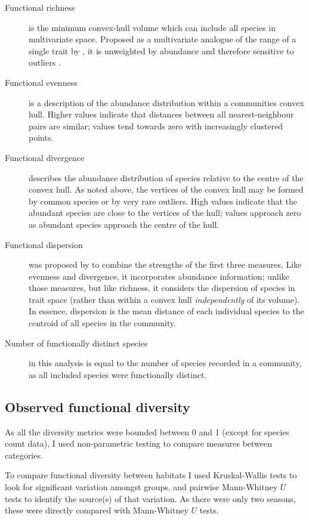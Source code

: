 \documentclass[12pt,a4paper,draft]{book}
\begin{document}
\begin{description}
\item[Functional richness] is the minimum convex-hull volume which can include all species in multivariate space. Proposed as a multivariate analogue of the range of a single trait by \cite{Villeger2008}, it is unweighted by abundance and therefore sensitive to outliers \cite{Laliberte2010}.
\item[Functional evenness] is a description of the abundance distribution within a communities convex hull. Higher values indicate that distances between all nearest-neighbour pairs are similar; values tend towards zero with increasingly clustered points.
\item[Functional divergence] describes the abundance distribution of species relative to the centre of the convex hull. As noted above, the vertices of the convex hull may be formed by common species or by very rare outliers. High values indicate that the abundant species are close to the vertices of the hull; values approach zero as abundant species approach the centre of the hull.
\item[Functional dispersion] was proposed by \cite{Laliberte2010} to combine the strengths of the first three measures. Like evenness and divergence, it incorporates abundance information; unlike those measures, but like richness, it considers the dispersion of species in trait space (rather than within a convex hull \textit{independently} of its volume). In essence, dispersion is the mean distance of each individual species to the centroid of all species in the community.
\item[Number of functionally distinct species] in this analysis is equal to the number of species recorded in a community, as all included species were functionally distinct.
\end{description}

\subsection{Observed functional diversity}

As all the diversity metrics were bounded between 0 and 1 (except for species count data), I used non-parametric testing to compare measures between categories. 

To compare functional diversity between habitats I used Kruskal-Wallis tests to look for significant variation amongst groups, and pairwise Mann-Whitney $U$ tests to identify the source(s) of that variation. As there were only two seasons, these were directly compared with Mann-Whitney $U$ tests.
\end{document}

